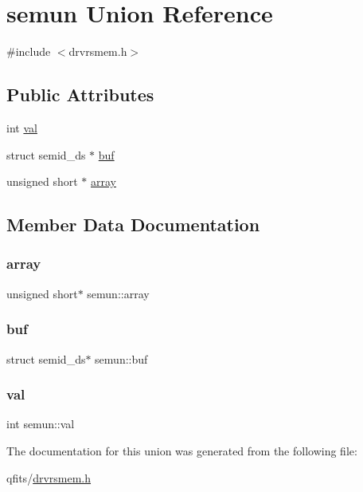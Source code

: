 \hypertarget{unionsemun}{}\section{semun Union Reference}
\label{unionsemun}


{\ttfamily \#include $<$drvrsmem.\+h$>$}

\subsection*{Public Attributes}
\begin{DoxyCompactItemize}
\item 
int \hyperlink{unionsemun_ac6121ecb6d04a024e07e12bd71b94031}{val}
\item 
struct semid\+\_\+ds $\ast$ \hyperlink{unionsemun_ac6b6428d07d4147fd2cc698b53555bed}{buf}
\item 
unsigned short $\ast$ \hyperlink{unionsemun_aca23b8e730a0553205813c0cb7692b54}{array}
\end{DoxyCompactItemize}


\subsection{Member Data Documentation}
\mbox{\label{unionsemun_aca23b8e730a0553205813c0cb7692b54}} 
\subsubsection{\texorpdfstring{array}{array}}
{\footnotesize\ttfamily unsigned short$\ast$ semun\+::array}

\mbox{\label{unionsemun_ac6b6428d07d4147fd2cc698b53555bed}} 
\subsubsection{\texorpdfstring{buf}{buf}}
{\footnotesize\ttfamily struct semid\+\_\+ds$\ast$ semun\+::buf}

\mbox{\label{unionsemun_ac6121ecb6d04a024e07e12bd71b94031}} 
\subsubsection{\texorpdfstring{val}{val}}
{\footnotesize\ttfamily int semun\+::val}



The documentation for this union was generated from the following file\+:\begin{DoxyCompactItemize}
\item 
qfits/\hyperlink{drvrsmem_8h}{drvrsmem.\+h}\end{DoxyCompactItemize}
